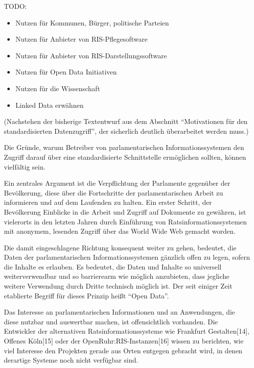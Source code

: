 \documentclass[,a4paper]{article}
\begin{document}
TODO:

\begin{itemize}
\itemsep1pt\parskip0pt
\item
  Nutzen für Kommunen, Bürger, politische Parteien
\item
  Nutzen für Anbieter von RIS-Pflegesoftware
\item
  Nutzen für Anbieter von RIS-Darstellungssoftware
\item
  Nutzen für Open Data Initiativen
\item
  Nutzen für die Wissenschaft
\item
  Linked Data erwähnen
\end{itemize}

(Nachstehen der bisherige Textentwurf aus dem Abschnitt ``Motivationen
für den standardisierten Datenzugriff'', der sicherlich deutlich
überarbeitet werden muss.)

Die Gründe, warum Betreiber von parlamentarischen Informationssystemen
den Zugriff darauf über eine standardisierte Schnittstelle ermöglichen
sollten, können vielfältig sein.

Ein zentrales Argument ist die Verpflichtung der Parlamente gegenüber
der Bevölkerung, diese über die Fortschritte der parlamentarischen
Arbeit zu informieren und auf dem Laufenden zu halten. Ein erster
Schritt, der Bevölkerung Einblicke in die Arbeit und Zugriff auf
Dokumente zu gewähren, ist vielerorts in den letzten Jahren durch
Einführung von Ratsinformationssystemen mit anonymem, lesenden Zugriff
über das World Wide Web gemacht worden.

Die damit eingeschlagene Richtung konsequent weiter zu gehen, bedeutet,
die Daten der parlamentarischen Informationssystemen gänzlich offen zu
legen, sofern die Inhalte es erlauben. Es bedeutet, die Daten und
Inhalte so universell weiterverwendbar und so barrierearm wie möglich
anzubieten, dass jegliche weitere Verwendung durch Dritte technisch
möglich ist. Der seit einiger Zeit etablierte Begriff für dieses Prinzip
heißt ``Open Data''.

Das Interesse an parlamentarischen Informationen und an Anwendungen, die
diese nutzbar und auswertbar machen, ist offensichtlich vorhanden. Die
Entwickler der alternativen Ratsinformationssysteme wie Frankfurt
Gestalten{[}14{]}, Offenes Köln{[}15{]} oder der
OpenRuhr:RIS-Instanzen{[}16{]} wissen zu berichten, wie viel Interesse
den Projekten gerade aus Orten entgegen gebracht wird, in denen
derartige Systeme noch nicht verfügbar sind.
\end{document}
